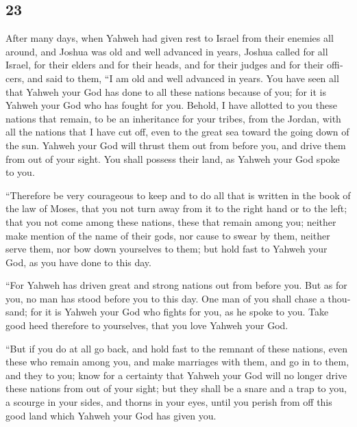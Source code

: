 \begin{paracol}{2}
\begin{otherlanguage}{english}
\hypertarget{section-45}{%
\section{23}\label{section-45}}

 After many days, when Yahweh had given rest to Israel
from their enemies all around, and Joshua was old and well advanced in
years,  Joshua called for all Israel, for their elders and
for their heads, and for their judges and for their officers, and said
to them, ``I am old and well advanced in years.  You have
seen all that Yahweh your God has done to all these nations because of
you; for it is Yahweh your God who has fought for you. 
Behold, I have allotted to you these nations that remain, to be an
inheritance for your tribes, from the Jordan, with all the nations that
I have cut off, even to the great sea toward the going down of the sun.
 Yahweh your God will thrust them out from before you, and
drive them from out of your sight. You shall possess their land, as
Yahweh your God spoke to you.

 ``Therefore be very courageous to keep and to do all that
is written in the book of the law of Moses, that you not turn away from
it to the right hand or to the left;  that you not come
among these nations, these that remain among you; neither make mention
of the name of their gods, nor cause to swear by them, neither serve
them, nor bow down yourselves to them;  but hold fast to
Yahweh your God, as you have done to this day.

 ``For Yahweh has driven great and strong nations out from
before you. But as for you, no man has stood before you to this day.
 One man of you shall chase a thousand; for it is Yahweh
your God who fights for you, as he spoke to you.  Take
good heed therefore to yourselves, that you love Yahweh your God.

 ``But if you do at all go back, and hold fast to the
remnant of these nations, even these who remain among you, and make
marriages with them, and go in to them, and they to you; 
know for a certainty that Yahweh your God will no longer drive these
nations from out of your sight; but they shall be a snare and a trap to
you, a scourge in your sides, and thorns in your eyes, until you perish
from off this good land which Yahweh your God has given you.


\end{otherlanguage}
\end{paracol}
